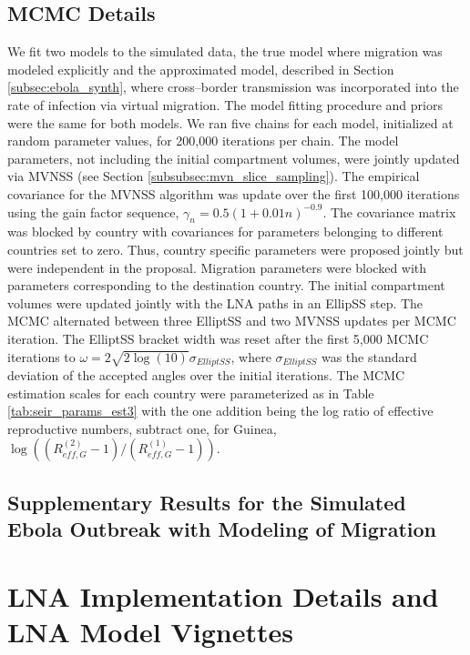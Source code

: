 \subsection{MCMC Details}
\label{subsec:ebola_synth_mcmc}
We fit two models to the simulated data, the true model where migration was modeled explicitly and the approximated model, described in Section \ref{subsec:ebola_synth}, where cross--border transmission was incorporated into the rate of infection via virtual migration. The model fitting procedure and priors were the same for both models. We ran five chains for each model, initialized at random parameter values, for 200,000 iterations per chain. The model parameters, not including the initial compartment volumes, were jointly updated via MVNSS (see Section \ref{subsubsec:mvn_slice_sampling}). The empirical covariance for the MVNSS algorithm was update over the first 100,000 iterations using the gain factor sequence, $\gamma_n = 0.5(1 + 0.01n)^{-0.9}$. The covariance matrix was blocked by country with covariances for parameters belonging to different countries set to zero. Thus, country specific parameters were proposed jointly but were independent in the proposal. Migration parameters were blocked with parameters corresponding to the destination country. The initial compartment volumes were updated jointly with the LNA paths in an EllipSS step. The MCMC alternated between three ElliptSS and two MVNSS updates per MCMC iteration. The ElliptSS bracket width was reset after the first 5,000 MCMC iterations to $ \omega = 2\sqrt{2\log(10)}\sigma_{ElliptSS}$, where $ \sigma_{ElliptSS} $ was the standard deviation of the accepted angles over the initial iterations. The MCMC estimation scales for each country were parameterized as in Table \ref{tab:seir_params_est3} with the one addition being the log ratio of effective reproductive numbers, subtract one, for Guinea, $ \log\left ((R_{eff,G}^{(2)}-1)/(R_{eff,G}^{(1)}-1)\right ) $. 

\newpage
\subsection{Supplementary Results for the Simulated Ebola Outbreak with Modeling of Migration}
\label{subsec:ebola_synth_fullmod_res}

\section{LNA Implementation Details and LNA Model Vignettes}
\label{sec:lna_implementation_vignettes}